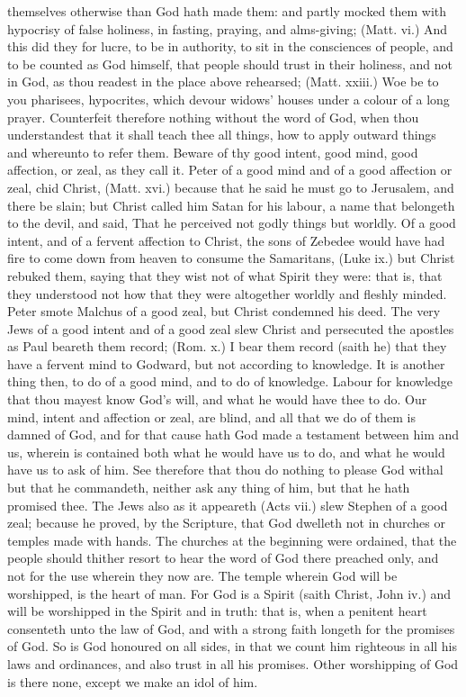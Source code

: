 themselves otherwise than God hath made them: and partly 
mocked them with hypocrisy of false holiness, in fasting, 
praying, and alms-giving; (Matt. vi.) And this did they for 
lucre, to be in authority, to sit in the consciences of people, 
and to be counted as God himself, that people should trust 
in their holiness, and not in God, as thou readest in the 
place above rehearsed; (Matt. xxiii.) Woe be to you pharisees,
hypocrites, which devour widows' houses under a 
colour of a long prayer. Counterfeit therefore nothing without
the word of God, when thou understandest that it shall 
teach thee all things, how to apply outward things and 
whereunto to refer them. Beware of thy good intent, good 
mind, good affection, or zeal, as they call it. Peter of a good 
mind and of a good affection or zeal, chid Christ, (Matt. xvi.) 
because that he said he must go to Jerusalem, and there be 
slain; but Christ called him Satan for his labour, a name 
that belongeth to the devil, and said, That he perceived not 
godly things but worldly. Of a good intent, and of a fervent 
affection to Christ, the sons of Zebedee would have had 
fire to come down from heaven to consume the Samaritans, 
(Luke ix.) but Christ rebuked them, saying that they wist 
not of what Spirit they were: that is, that they understood 
not how that they were altogether worldly and fleshly minded. 
Peter smote Malchus of a good zeal, but Christ condemned
his deed. The very Jews of a good intent and of 
a good zeal slew Christ and persecuted the apostles as 
Paul beareth them record; (Rom. x.) I bear them record 
(saith he) that they have a fervent mind to Godward, but 
not according to knowledge. It is another thing then, to 
do of a good mind, and to do of knowledge. Labour 
for knowledge that thou mayest know God's will, and 
what he would have thee to do. Our mind, intent and 
affection or zeal, are blind, and all that we do of them is 
damned of God, and for that cause hath God made a 
testament between him and us, wherein is contained both 
what he would have us to do, and what he would have us 
to ask of him. See therefore that thou do nothing to 
please God withal but that he commandeth, neither ask 
any thing of him, but that he hath promised thee. The 
Jews also as it appeareth (Acts vii.) slew Stephen of a 
good zeal; because he proved, by the Scripture, that God 
dwelleth not in churches or temples made with hands. 
The churches at the beginning were ordained, that the 
people should thither resort to hear the word of God there 
preached only, and not for the use wherein they now are. 
The temple wherein God will be worshipped, is the heart 
of man. For God is a Spirit (saith Christ, John iv.) and 
will be worshipped in the Spirit and in truth: that is, 
when a penitent heart consenteth unto the law of God, 
and with a strong faith longeth for the promises of God. 
So is God honoured on all sides, in that we count him 
righteous in all his laws and ordinances, and also trust in 
all his promises. Other worshipping of God is there 
none, except we make an idol of him. 


